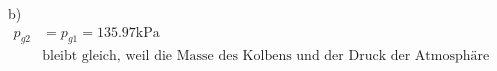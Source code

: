 b) 
\begin{align*}
    p_{g2} &= p_{g1} = 135.97 \text{kPa} \\
    &\text{bleibt gleich, weil die Masse des Kolbens und der Druck der Atmosphäre gleich bleiben.}
\end{align*}